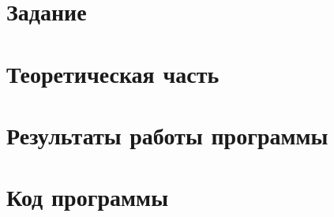 \documentclass[12pt, a4paper]{article}
\begin{document}
	
	
	
	\section{Задание}
	
	
	\section{Теоретическая часть}
	
	\newpage
	
	\section{Результаты работы программы}
	
	\newpage
	
	\section{Код программы}
	
	
\end{document}
